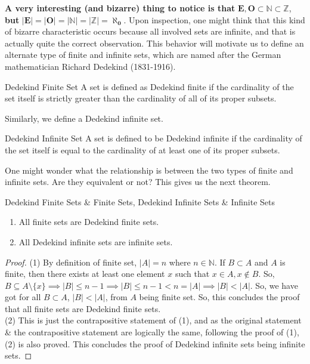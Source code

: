 \noindent \textbf{A very interesting (and bizarre) thing to notice is that} $\pmb{E,O\subset\mathbb{N}\subset\mathbb{Z}}$, \textbf{but} $\pmb{|E|=|O|=|\mathbb{N}|=|\mathbb{Z}|=\aleph_0}$. Upon inspection, one might think that this kind of bizarre characteristic occurs because all involved sets are infinite, and that is actually quite the correct observation. This behavior will motivate us to define an alternate type of finite and infinite sets, which are named after the German mathematician Richard Dedekind (1831-1916).
\begin{Definition}{Dedekind Finite Set}\label{dedekind_finite_set}
    A set is defined as Dedekind finite if the cardinality of the set itself is strictly greater than the cardinality of all of its proper subsets.
\end{Definition}
\noindent Similarly, we define a Dedekind infinite set.
\begin{Definition}{Dedekind Infinite Set}\label{dedekind_infinite_set}
    A set is defined to be Dedekind infinite if the cardinality of the set itself is equal to the cardinality of at least one of its proper subsets.
\end{Definition}
\noindent One might wonder what the relationship is between the two types of finite and infinite sets. Are they equivalent or not? This gives us the next theorem.
\begin{Theorem}{Dedekind Finite Sets \& Finite Sets, Dedekind Infinite Sets \& Infinite Sets}\label{dedekind_finite_sets_and_dedekind_infinite_sets}
    \begin{enumerate}
        \item All finite sets are Dedekind finite sets.
        \item All Dedekind infinite sets are infinite sets.
    \end{enumerate}
\end{Theorem}
\begin{proof}
    (1) By definition of finite set, $|A|=n$ where $n\in\mathbb{N}$. If $B\subset A$ and $A$ is finite, then there exists at least one element $x$ such that $x\in A, x\notin B$. So,
    $B\subseteq A\setminus\{x\}\implies|B|\leq n-1\implies|B|\leq n-1<n=|A|\implies|B|<|A|$. So, we have got for all $B\subset A$, $|B|<|A|$, from $A$ being finite set. So, this concludes the proof that all finite sets are Dedekind finite sets.\\
    (2) This is just the contrapositive statement of (1), and as the original statement \& the contrapositive statement are logically the same, following the proof of (1), (2) is also proved. This concludes the proof of Dedekind infinite sets being infinite sets.
\end{proof}
